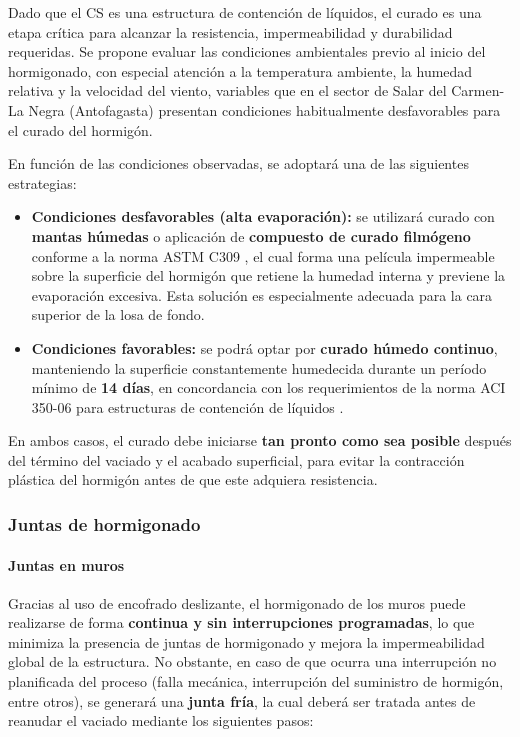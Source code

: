 Dado que el CS es una estructura de contención de líquidos, el curado es una etapa crítica para alcanzar la resistencia, impermeabilidad y durabilidad requeridas. Se propone evaluar las condiciones ambientales previo al inicio del hormigonado, con especial atención a la temperatura ambiente, la humedad relativa y la velocidad del viento, variables que en el sector de Salar del Carmen-La Negra (Antofagasta) presentan condiciones habitualmente desfavorables para el curado del hormigón.

En función de las condiciones observadas, se adoptará una de las siguientes estrategias:

\begin{itemize}
    \item \textbf{Condiciones desfavorables (alta evaporación):} se utilizará curado con \textbf{mantas húmedas} o aplicación de \textbf{compuesto de curado filmógeno} conforme a la norma ASTM C309 \cite{CITAR_ASTM_C309}, el cual forma una película impermeable sobre la superficie del hormigón que retiene la humedad interna y previene la evaporación excesiva. Esta solución es especialmente adecuada para la cara superior de la losa de fondo.
    \item \textbf{Condiciones favorables:} se podrá optar por \textbf{curado húmedo continuo}, manteniendo la superficie constantemente humedecida durante un período mínimo de \textbf{14 días}, en concordancia con los requerimientos de la norma ACI 350-06 para estructuras de contención de líquidos \cite{ACI350}.
\end{itemize}

En ambos casos, el curado debe iniciarse \textbf{tan pronto como sea posible} después del término del vaciado y el acabado superficial, para evitar la contracción plástica del hormigón antes de que este adquiera resistencia.

\subsubsection{Juntas de hormigonado}

\paragraph{Juntas en muros}

Gracias al uso de encofrado deslizante, el hormigonado de los muros puede realizarse de forma \textbf{continua y sin interrupciones programadas}, lo que minimiza la presencia de juntas de hormigonado y mejora la impermeabilidad global de la estructura. No obstante, en caso de que ocurra una interrupción no planificada del proceso (falla mecánica, interrupción del suministro de hormigón, entre otros), se generará una \textbf{junta fría}, la cual deberá ser tratada antes de reanudar el vaciado mediante los siguientes pasos:

